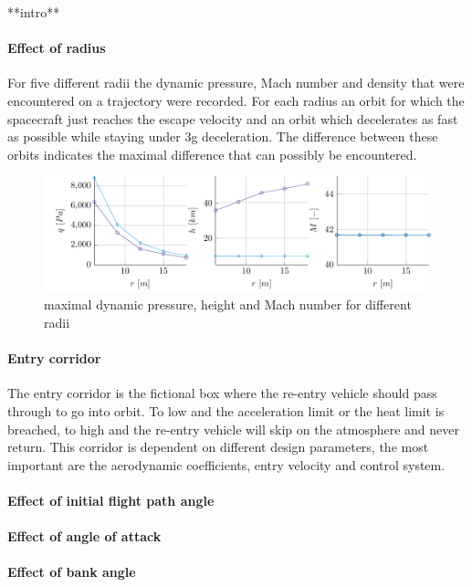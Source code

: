 **intro**

\paragraph{Effect of radius}
For five different radii the dynamic pressure, Mach number and density that were encountered on a trajectory were recorded. For each radius an orbit for which the spacecraft just reaches the escape velocity and an orbit which decelerates as fast as possible while staying under 3g deceleration. The difference between these orbits indicates the maximal difference that can possibly be encountered.

\begin{figure}[H]
	\centering
	\includegraphics[width=1\textwidth]{./Figure/orbit/radius_param.pdf}
	\caption{maximal dynamic pressure, height and Mach number for different radii}
	\label{fig:radius}
\end{figure}

\paragraph{Entry corridor}
The entry corridor is the fictional box where the re-entry vehicle should pass through to go into orbit. To low and the acceleration limit or the heat limit is breached, to high and the re-entry vehicle will skip on the atmosphere and never return. This corridor is dependent on different design parameters, the most important are the aerodynamic coefficients, entry velocity and control system.

\paragraph{Effect of initial flight path angle}

\paragraph{Effect of angle of attack}

\paragraph{Effect of bank angle}



